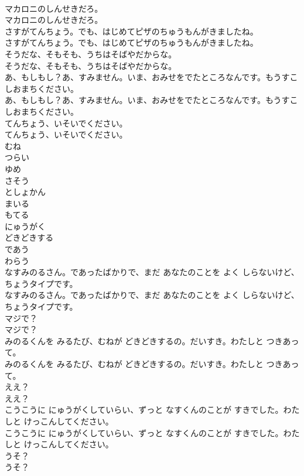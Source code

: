 \documentclass[8pt]{extreport}
\begin{document}
\begin{CJK}{UTF8}{min}
\\	マカロニのしんせきだろ。
\\	マカロニのしんせきだろ。
\\	さすがてんちょう。でも、はじめてピザのちゅうもんがきましたね。
\\	さすがてんちょう。でも、はじめてピザのちゅうもんがきましたね。
\\	そうだな、そもそも、うちはそばやだからな。
\\	そうだな、そもそも、うちはそばやだからな。
\\	あ、もしもし？あ、すみません。いま、おみせをでたところなんです。もうすこしおまちください。
\\	あ、もしもし？あ、すみません。いま、おみせをでたところなんです。もうすこしおまちください。
\\	てんちょう、いそいでください。
\\	てんちょう、いそいでください。
\\	むね
\\	つらい
\\	ゆめ
\\	さそう
\\	としょかん
\\	まいる
\\	もてる
\\	にゅうがく
\\	どきどきする
\\	であう
\\	わらう
\\	なすみのるさん。であったばかりで、まだ あなたのことを よく しらないけど、ちょうタイプです。
\\	なすみのるさん。であったばかりで、まだ あなたのことを よく しらないけど、ちょうタイプです。
\\	マジで？
\\	マジで？
\\	みのるくんを みるたび、むねが どきどきするの。だいすき。わたしと つきあって。
\\	みのるくんを みるたび、むねが どきどきするの。だいすき。わたしと つきあって。
\\	ええ？
\\	ええ？
\\	こうこうに にゅうがくしていらい、ずっと なすくんのことが すきでした。わたしと けっこんしてください。
\\	こうこうに にゅうがくしていらい、ずっと なすくんのことが すきでした。わたしと けっこんしてください。
\\	うそ？
\\	うそ？

\end{CJK}
\end{document}
